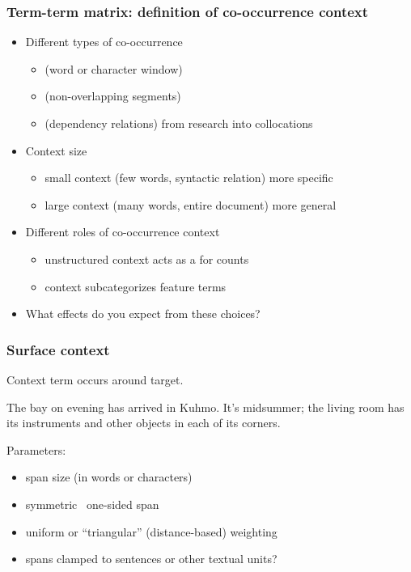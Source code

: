 \documentclass[t]{beamer} %
\begin{document}
\begin{frame}
  \frametitle{Term-term matrix: definition of co-occurrence context}
  
  \begin{itemize}
  \item Different types of co-occurrence \citep{Evert:08}
    \begin{itemize}
    \item {} (word or character window)
    \item {} (non-overlapping segments)
    \item {} (dependency relations)
    \itemhand from research into collocations
    \end{itemize}
    \gap
  \item<2-> Context size
    \begin{itemize}
    \item small context (few words, syntactic relation) \so more specific
    \item large context (many words, entire document) \so more general
    \end{itemize}
    \gap
  \item<3-> Different roles of co-occurrence context
    \begin{itemize}
    \item unstructured context \so acts as a  for counts
    \item {} context \so subcategorizes feature terms
    \end{itemize}
    \gap
  \item<4->[\hand] What effects do you expect from these choices?
  \end{itemize}
\end{frame}

\begin{frame}
  \frametitle{Surface context}
  
  \begin{center}
    Context term occurs  around target.
  \end{center}

  The  bay on  evening has arrived in Kuhmo. It's midsummer; the living room has its instruments and other objects in each of its corners.
  $\quad$ \primary{[L3/R3 span, $k = 6$]}
  
  \gap
  Parameters:
  \begin{itemize}
  \item span size (in words or characters)
  \item symmetric \vs\ one-sided span
  \item uniform or ``triangular'' (distance-based) weighting 
  \item spans clamped to sentences or other textual units?
  \end{itemize}
\end{frame}
\end{document}
